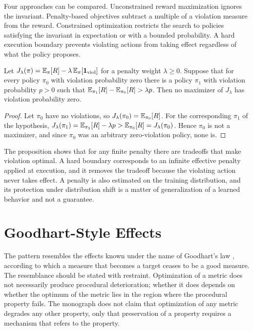 Four approaches can be compared. Unconstrained reward maximization ignores the invariant. Penalty-based objectives subtract a multiple of a violation measure from the reward. Constrained optimization restricts the search to policies satisfying the invariant in expectation or with a bounded probability. A hard execution boundary prevents violating actions from taking effect regardless of what the policy proposes.

\begin{proposition}\label{prop:penalty}
Let $J_\lambda(\pi)=\mathbb{E}_\pi[R]-\lambda\,\mathbb{E}_\pi[\mathbf 1_{\mathrm{viol}}]$ for a penalty weight $\lambda\ge0$. Suppose that for every policy $\pi_0$ with violation probability zero there is a policy $\pi_1$ with violation probability $p>0$ such that $\mathbb{E}_{\pi_1}[R]-\mathbb{E}_{\pi_0}[R]>\lambda p$. Then no maximizer of $J_\lambda$ has violation probability zero.
\end{proposition}

\begin{proof}
Let $\pi_0$ have no violations, so $J_\lambda(\pi_0)=\mathbb{E}_{\pi_0}[R]$. For the corresponding $\pi_1$ of the hypothesis, $J_\lambda(\pi_1)=\mathbb{E}_{\pi_1}[R]-\lambda p>\mathbb{E}_{\pi_0}[R]=J_\lambda(\pi_0)$. Hence $\pi_0$ is not a maximizer, and since $\pi_0$ was an arbitrary zero-violation policy, none is.
\end{proof}

The proposition shows that for any finite penalty there are tradeoffs that make violation optimal. A hard boundary corresponds to an infinite effective penalty applied at execution, and it removes the tradeoff because the violating action never takes effect. A penalty is also estimated on the training distribution, and its protection under distribution shift is a matter of generalization of a learned behavior and not a guarantee.

\section{Goodhart-Style Effects}

The pattern resembles the effects known under the name of Goodhart's law \cite{goodhart1984,strathern1997}, according to which a measure that becomes a target ceases to be a good measure. The resemblance should be stated with restraint. Optimization of a metric does not necessarily produce procedural deterioration; whether it does depends on whether the optimum of the metric lies in the region where the procedural property fails. The monograph does not claim that optimization of any metric degrades any other property, only that preservation of a property requires a mechanism that refers to the property.

